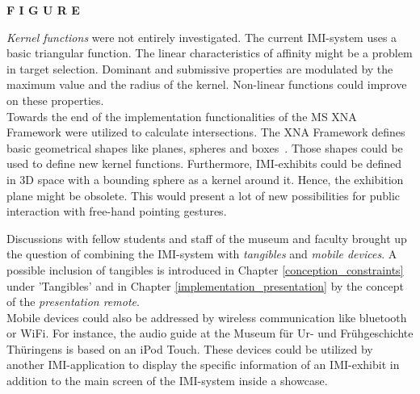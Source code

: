 \textbf{F I G U R E}

\textit{Kernel functions} were not entirely investigated. The current \ac{IMI}-system uses a basic triangular function. The linear characteristics of affinity might be a problem in target selection. Dominant and submissive properties are modulated by the maximum value and the radius of the kernel. Non-linear functions could improve on these properties.
\\
Towards the end of the implementation functionalities of the \ac{MS} XNA Framework were utilized to calculate intersections. The XNA Framework defines basic geometrical shapes like planes, spheres and boxes~\cite{MSXNA}. Those shapes could be used to define new kernel functions. Furthermore, \ac{IMI}-exhibits could be defined in \ac{3D} space with a bounding sphere as a kernel around it. Hence, the exhibition plane might be obsolete. This would present a lot of new possibilities for public interaction with free-hand pointing gestures.

Discussions with fellow students and staff of the museum and faculty brought up the question of combining the \ac{IMI}-system with \textit{tangibles} and \textit{mobile devices}. A possible inclusion of tangibles is introduced in Chapter \ref{conception_constraints} under 'Tangibles' and in Chapter \ref{implementation_presentation} by the concept of the \textit{presentation remote}.
\\
Mobile devices could also be addressed by wireless communication like bluetooth or WiFi. For instance, the audio guide at the Museum für Ur- und Frühgeschichte Thüringens is based on an iPod Touch. These devices could be utilized by another \ac{IMI}-application to display the specific information of an \ac{IMI}-exhibit in addition to the main screen of the \ac{IMI}-system inside a showcase.

